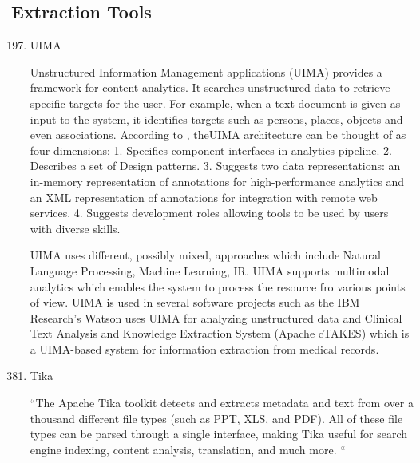 \subsection{Extraction Tools}
\label{\detokenize{i524/technologies:extraction-tools}}\begin{enumerate}
\setcounter{enumi}{196}
\item {} 
UIMA

Unstructured Information Management applications (UIMA) provides
a framework for content analytics. It searches unstructured data
to retrieve specific targets for the user. For example, when a
text document is given as input to the system, it identifies
targets such as persons, places, objects and even
associations. According to , \label{\detokenize{i524/technologies:id362}}{\hyperref[\detokenize{i524/technologies:www-wiki-uima}]{\sphinxcrossref{{[}310{]}}}} theUIMA
architecture can be thought of as four dimensions: 1. Specifies
component interfaces in analytics pipeline.  2. Describes a set
of Design patterns. 3. Suggests two data representations: an
in-memory representation of annotations for high-performance
analytics and an XML representation of annotations for
integration with remote web services. 4. Suggests development
roles allowing tools to be used by users with diverse skills.

UIMA uses different, possibly mixed, approaches which include
Natural Language Processing, Machine Learning, IR. UIMA supports
multimodal analytics \label{\detokenize{i524/technologies:id363}}{\hyperref[\detokenize{i524/technologies:www-uima-slideshare}]{\sphinxcrossref{{[}311{]}}}} which enables
the system to process the resource fro various points of
view. UIMA is used in several software projects such as the IBM
Research's Watson uses UIMA for analyzing unstructured data and
Clinical Text Analysis and Knowledge Extraction System (Apache
cTAKES) which is a UIMA-based system for information extraction
from medical records.

\end{enumerate}
\begin{enumerate}
\setcounter{enumi}{380}
\item {} 
Tika

``The Apache Tika toolkit detects and extracts metadata and text
from over a thousand different file types (such as PPT, XLS, and
PDF). All of these file types can be parsed through a single
interface, making Tika useful for search engine indexing, content
analysis, translation, and much more. \label{\detokenize{i524/technologies:id364}}{\hyperref[\detokenize{i524/technologies:www-tika}]{\sphinxcrossref{{[}312{]}}}}``

\end{enumerate}


